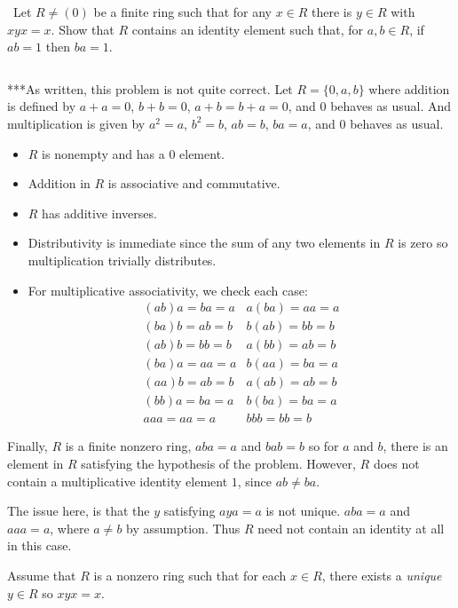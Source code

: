 \documentclass[12pt]{AlgebraQual}
\begin{document}
\begin{problem} $\,$
Let $R\not=(0)$ be a finite ring such that for any $x\in R$ there is $y\in R$ with $xyx=x$. Show that $R$ contains an identity element such that, for $a,b\in R$, if $ab=1$ then $ba=1$.
\end{problem}


\begin{solution}$\,$
\begin{mybox}
***As written, this problem is not quite correct. Let $R=\{0,a,b\}$ where addition is defined by $a+a=0$, $b+b=0$, $a+b=b+a=0$, and $0$ behaves as usual. And multiplication is given by $a^2=a$, $b^2=b$, $ab=b$, $ba=a$, and $0$ behaves as usual.

\begin{itemize}
    \item $R$ is nonempty and has a $0$ element.
    \item Addition in $R$ is associative and commutative.
    \item $R$ has additive inverses.
    \item Distributivity is immediate since the sum of any two elements in $R$ is zero so multiplication trivially distributes.
    \item For multiplicative associativity, we check each case: $$\begin{matrix}
    (ab)a=ba=a & a(ba)=aa=a\\
    (ba)b=ab=b & b(ab)=bb=b\\
    (ab)b=bb=b & a(bb)=ab=b\\
    (ba)a=aa=a & b(aa)=ba=a\\
    (aa)b=ab=b & a(ab)=ab=b\\
    (bb)a=ba=a & b(ba)=ba=a\\
    aaa=aa=a & bbb=bb=b
    \end{matrix}$$
\end{itemize}

Finally, $R$ is a finite nonzero ring, $aba=a$ and $bab=b$ so for $a$ and $b$, there is an element in $R$ satisfying the hypothesis of the problem. However, $R$ does not contain a multiplicative identity element $1$, since $ab\not=ba$.

The issue here, is that the $y$ satisfying $aya=a$ is not unique. $aba=a$ and $aaa=a$, where $a\not=b$ by assumption. Thus $R$ need not contain an identity at all in this case.
\end{mybox}

Assume that $R$ is a nonzero ring such that for each $x\in R$, there exists a \textit{unique} $y\in R$ so $xyx=x$.


\end{solution}
\end{document}
